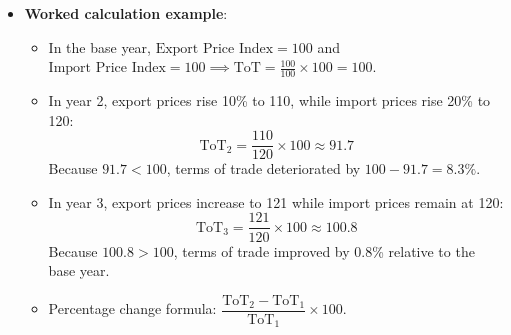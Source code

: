 \documentclass[a4paper,12pt]{article}
\begin{document}
\begin{itemize}
\begin{itemize}
  \end{itemize}
  \item \textbf{Worked calculation example}:
  \begin{itemize}
    \item In the base year, $\text{Export Price Index} = 100$ and $\text{Import Price Index} = 100 \implies \text{ToT} = \frac{100}{100} \times 100 = 100$.
    \item In year 2, export prices rise 10\% to 110, while import prices rise 20\% to 120:
    \[\text{ToT}_2 = \dfrac{110}{120} \times 100 \approx 91.7\]
    Because $91.7 < 100$, terms of trade deteriorated by $100 - 91.7 = 8.3\%$.
    \item In year 3, export prices increase to 121 while import prices remain at 120:
    \[\text{ToT}_3 = \dfrac{121}{120} \times 100 \approx 100.8\]
    Because $100.8 > 100$, terms of trade improved by 0.8\% relative to the base year.
    \item Percentage change formula: $\dfrac{\text{ToT}_2 - \text{ToT}_1}{\text{ToT}_1} \times 100$.
  \end{itemize}
\end{itemize}
\end{document}
